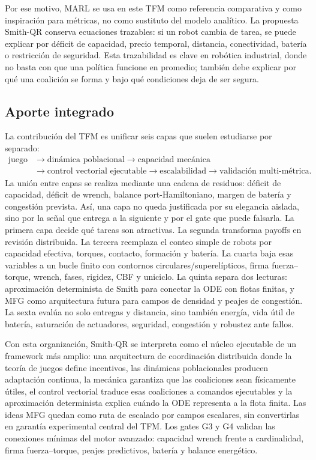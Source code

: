 Por ese motivo, MARL se usa en este TFM como referencia comparativa y como inspiración
para métricas, no como sustituto del modelo analítico. La propuesta Smith-QR conserva
ecuaciones trazables: si un robot cambia de tarea, se puede explicar por déficit de
capacidad, precio temporal, distancia, conectividad, batería o restricción de seguridad.
Esta trazabilidad es clave en robótica industrial, donde no basta con que una política
funcione en promedio; también debe explicar por qué una coalición se forma y bajo qué
condiciones deja de ser segura.

\subsection*{Aporte integrado}

La contribución del TFM es unificar seis capas que suelen estudiarse por separado:
\[
  \begin{aligned}
  \text{juego}
  &\rightarrow
  \text{dinámica poblacional}
  \rightarrow
  \text{capacidad mecánica}\\
  &\rightarrow
  \text{control vectorial ejecutable}
  \rightarrow
  \text{escalabilidad}
  \rightarrow
  \text{validación multi-métrica}.
  \end{aligned}
\]
La unión entre capas se realiza mediante una cadena de residuos: déficit de capacidad,
déficit de wrench, balance port-Hamiltoniano, margen de batería y congestión prevista.
Así, una capa no queda justificada por su elegancia aislada, sino por la señal que entrega
a la siguiente y por el gate que puede falsarla.
La primera capa decide qué tareas son atractivas. La segunda transforma payoffs en
revisión distribuida. La tercera reemplaza el conteo simple de robots por capacidad
efectiva, torques, contacto, formación y batería. La cuarta baja esas variables a un
bucle finito con contornos circulares/superelípticos, firma fuerza--torque, wrench,
fases, rigidez, CBF y uniciclo. La quinta separa
dos lecturas: aproximación determinista de Smith para conectar la ODE con flotas finitas,
y MFG como arquitectura futura para campos de densidad y peajes de congestión. La sexta
evalúa no solo entregas y distancia, sino también energía, vida útil de batería,
saturación de actuadores, seguridad, congestión y robustez ante fallos.

Con esta organización, Smith-QR se interpreta como el núcleo ejecutable de un framework
más amplio: una arquitectura de coordinación distribuida donde la teoría de juegos
define incentivos, las dinámicas poblacionales producen adaptación continua, la mecánica
garantiza que las coaliciones sean físicamente útiles, el control vectorial traduce esas
coaliciones a comandos ejecutables y la aproximación determinista explica cuándo la ODE
representa a la flota finita. Las ideas MFG quedan como ruta de escalado por campos
escalares, sin convertirlas en garantía experimental central del TFM. Los gates G3 y G4
validan las conexiones mínimas del motor avanzado: capacidad wrench frente a cardinalidad,
firma fuerza--torque, peajes predictivos, batería y balance energético.
